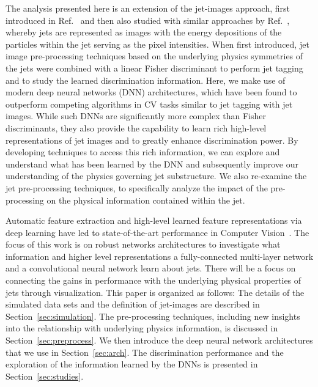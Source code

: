 \documentclass{article}
\begin{document}
The analysis presented here is an extension of the jet-images approach, first introduced in Ref.~\cite{Cogan:2014oua} and then also studied with similar approaches by Ref.~\cite{Almeida:2015jua}, whereby jets are represented as images with the energy depositions of the particles within the jet serving as the pixel intensities.  When first introduced, jet image pre-processing techniques based on the underlying physics symmetries of the jets were combined with a linear Fisher discriminant to perform jet tagging and to study the learned discrimination information.  Here, we make use of modern deep neural networks (DNN) architectures, which have been found to outperform competing algorithms in CV tasks similar to jet tagging with jet images.  While such DNNs are significantly more complex than Fisher discriminants, they also provide the capability to learn rich high-level representations of jet images and to greatly enhance discrimination power.  By developing techniques to access this rich information, we can explore and understand what has been learned by the DNN and subsequently improve our understanding of the physics governing jet substructure.  We also re-examine the jet pre-processing techniques, to specifically analyze the impact of the pre-processing on the physical information contained within the jet.

Automatic feature extraction and high-level learned feature representations via deep learning have led to state-of-the-art performance in Computer Vision~\cite{vggnet,maxout:goodfellow,dropout:and:LRN}.  The focus of this work is on robust networks architectures to investigate what information and higher level representations a fully-connected multi-layer network and a convolutional neural network learn about jets.  There will be a focus on connecting the gains in performance with the underlying physical properties of jets through visualization. This paper is organized as follows:  The details of the simulated data sets and the definition of jet-images are described in Section~\ref{sec:simulation}.    The pre-processing techniques, including new insights into the relationship with underlying physics information, is discussed in Section~\ref{sec:preprocess}.  We then introduce the deep neural network architectures that we use in Section~\ref{sec:arch}.  The discrimination performance and the exploration of the information learned by the DNNs is presented in Section~\ref{sec:studies}.





\end{document}
